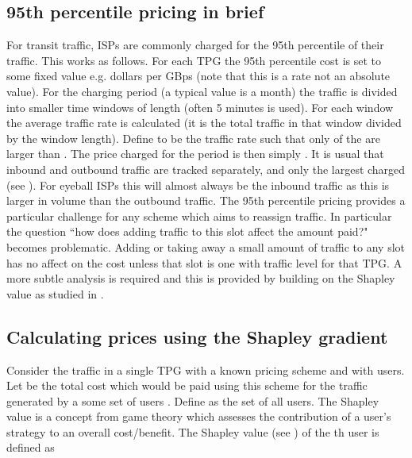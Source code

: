 \subsection{95th percentile pricing in brief}
\label{sec:percentile}

For transit traffic, ISPs are commonly charged for
the 95th percentile of their traffic.  This works as follows.
For each TPG
the 95th percentile cost is set to some fixed value
e.g.  dollars per GBps (note that this is a rate not an
absolute value). For the charging
period  (a typical
value is a month)
the traffic is divided into smaller  
time windows of length  (often 5 minutes is used).
For each window  the average traffic rate  is calculated 
(it is the total traffic in that window divided by  the window
length).
Define  to
be the traffic rate  such that only  of the 
 are larger than .
The price charged for the period  is then simply .
It is usual that inbound and outbound traffic are tracked
separately, and only the largest charged (see \cite{dimitr2009perc}).
For eyeball ISPs this will almost always be the inbound traffic as this
is larger in volume than the outbound traffic.
The 95th percentile pricing provides a particular challenge for any scheme 
which aims to reassign traffic.  In particular the question ``how
does adding traffic to this slot affect the amount paid?" becomes
problematic.  Adding or taking away a small amount of traffic to any
slot has no affect on the cost unless that slot is one with 
traffic level  for that TPG.  A more subtle analysis is
required and this is provided by building on the Shapley value as
studied in \cite{stanojevic2010heavy}.  

\subsection{Calculating prices using the Shapley gradient}
\label{sec:shapleygradient}

Consider the traffic in a single TPG with a known pricing scheme and
with  users.
Let
 be the total cost which would be paid using
this scheme for the traffic 
generated by a some set of users .  Define  as the
set of all  users.
The Shapley value is a concept from game theory which assesses the
contribution of a user's strategy to an overall cost/benefit.  The
Shapley value 
(see \cite{stanojevic2010heavy}) of
the th user is defined as 

